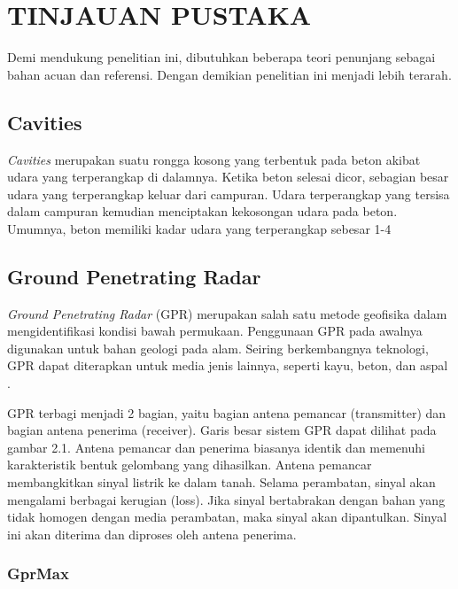 \chapter{TINJAUAN PUSTAKA}
\label{chap:tinjauanpustaka}


Demi mendukung penelitian ini, dibutuhkan beberapa teori penunjang sebagai bahan acuan dan referensi. 
Dengan demikian penelitian ini menjadi lebih terarah.

\section{Cavities}
\label{sec:cavities}

\emph{Cavities} merupakan suatu rongga kosong yang terbentuk pada beton akibat udara yang terperangkap di dalamnya. 
Ketika beton selesai dicor, sebagian besar udara yang terperangkap keluar dari campuran. 
Udara terperangkap yang tersisa dalam campuran kemudian menciptakan kekosongan udara pada beton. 
Umumnya, beton memiliki kadar udara yang terperangkap sebesar 1-4%

\section{Ground Penetrating Radar}
\label{sec:groundPenetratingRadar}

\emph{Ground Penetrating Radar} (GPR) merupakan salah satu metode geofisika dalam mengidentifikasi kondisi bawah permukaan. 
Penggunaan GPR pada awalnya digunakan untuk bahan geologi pada alam. 
Seiring berkembangnya teknologi, GPR dapat diterapkan untuk media jenis lainnya, seperti kayu, beton, dan aspal \parencite{jol2008ground}.

GPR terbagi menjadi 2 bagian, yaitu bagian antena pemancar (transmitter) dan bagian antena penerima (receiver). 
Garis besar sistem GPR dapat dilihat pada gambar 2.1. 
Antena pemancar dan penerima biasanya identik dan memenuhi karakteristik bentuk gelombang yang dihasilkan. 
Antena pemancar membangkitkan sinyal listrik ke dalam tanah. 
Selama perambatan, sinyal akan mengalami berbagai kerugian (loss). 
Jika sinyal bertabrakan dengan bahan yang tidak homogen dengan media perambatan, maka sinyal akan dipantulkan. 
Sinyal ini akan diterima dan diproses oleh antena penerima.

\subsection{GprMax}
\label{subsec:gprMax}

